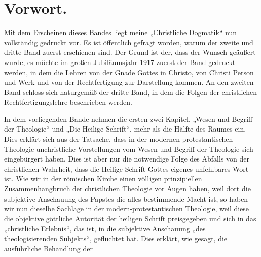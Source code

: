 \section*{Vorwort.}

Mit dem Erscheinen dieses Bandes liegt meine „Christliche Dogmatik“ nun vollständig gedruckt vor. Es ist öffentlich gefragt worden, warum der zweite und dritte Band zuerst erschienen sind. Der Grund ist der, dass der Wunsch geäußert wurde, es möchte im großen Jubiläumsjahr 1917 zuerst der Band gedruckt werden, in dem die Lehren von der Gnade Gottes in Christo, von Christi Person und Werk und von der Rechtfertigung zur Darstellung kommen. An den zweiten Band schloss sich naturgemäß der dritte Band, in dem die Folgen der christlichen Rechtfertigungslehre beschrieben werden.

In dem vorliegenden Bande nehmen die ersten zwei Kapitel, „Wesen und Begriff der Theologie“ und „Die Heilige Schrift“, mehr als die Hälfte des Raumes ein. Dies erklärt sich aus der Tatsache, dass in der modernen protestantischen Theologie unchristliche Vorstellungen vom Wesen und Begriff der Theologie sich eingebürgert haben. Dies ist aber nur die notwendige Folge des Abfalls von der christlichen Wahrheit, dass die Heilige Schrift Gottes eigenes unfehlbares Wort ist. Wie wir in der römischen Kirche einen völligen prinzipiellen Zusammenhangbruch der christlichen Theologie vor Augen haben, weil dort die subjektive Anschauung des Papstes die alles bestimmende Macht ist, so haben wir nun dieselbe Sachlage in der modern-protestantischen Theologie, weil diese die objektive göttliche Autorität der heiligen Schrift preisgegeben und sich in das „christliche Erlebnis“, das ist, in die subjektive Anschauung „des theologisierenden Subjekts“, geflüchtet hat. Dies erklärt, wie gesagt, die ausführliche Behandlung der